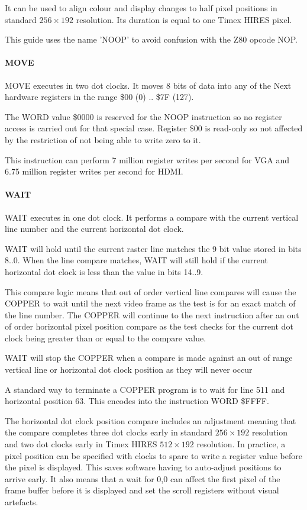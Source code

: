 It can be used to align colour and display changes to half pixel
positions in standard $256\times192$ resolution. Its duration is equal
to one Timex HIRES pixel.

This guide uses the name 'NOOP' to avoid confusion with the Z80 opcode
NOP.

\paragraph{MOVE}

MOVE executes in two dot clocks. It moves 8 bits of data into any of
the Next hardware registers in the range \$00 (0) .. \$7F (127).

The WORD value \$0000 is reserved for the NOOP instruction so no
register access is carried out for that special case. Register \$00 is
read-only so not affected by the restriction of not being able to
write zero to it.

This instruction can perform 7 million register writes per second for
VGA and 6.75 million register writes per second for HDMI.

\paragraph{WAIT}

WAIT executes in one dot clock. It performs a compare with the current
vertical line number and the current horizontal dot clock.

WAIT will hold until the current raster line matches the 9 bit value
stored in bits 8..0. When the line compare matches, WAIT will still
hold if the current horizontal dot clock is less than the value in
bits 14..9.

This compare logic means that out of order vertical line compares will
cause the COPPER to wait until the next video frame as the test is for
an exact match of the line number. The COPPER will continue to the
next instruction after an out of order horizontal pixel position
compare as the test checks for the current dot clock being greater
than or equal to the compare value.

WAIT will stop the COPPER when a compare is made against an out of
range vertical line or horizontal dot clock position as they will
never occur

A standard way to terminate a COPPER program is to wait for line 511
and horizontal position 63. This encodes into the instruction WORD
\$FFFF.

The horizontal dot clock position compare includes an adjustment
meaning that the compare completes three dot clocks early in standard
$256\times192$ resolution and two dot clocks early in Timex HIRES
$512\times192$ resolution. In practice, a pixel position can be
specified with clocks to spare to write a register value before the
pixel is displayed. This saves software having to auto-adjust
positions to arrive early. It also means that a wait for 0,0 can
affect the first pixel of the frame buffer before it is displayed and
set the scroll registers without visual artefacts.


